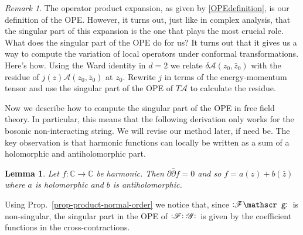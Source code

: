 \documentclass{report}
\theoremstyle{plain}
\newtheorem{lemma}[theorem]{Lemma}
\theoremstyle{definition}
\theoremstyle{remark}
\newtheorem*{remark}{Remark}
\newcommand{\FR}[2]{\frac{#1}{#2}}
\newcommand{\ms}{\mathscr}
\newcommand{\sg}{\sigma}
\newcommand{\di}{\partial}
\newcommand{\NO}[1]{\vcentcolon\mathrel{#1}\vcentcolon\,}
\newcommand{\bC}{\mathbb{C}}
\begin{document}
\begin{remark} The operator product expansion, as given by
\eqref{OPEdefinition}, is our definition of the OPE. However, it turns out,
just like in complex analysis, that the singular part of this expansion is
the one that plays the most crucial role. What does the singular part of
the OPE do for us? It turns out that it gives us a way to compute the
variation of local operators under conformal transformations. Here's how.
Using the Ward identity in $d=2$ we relate $\delta\ms A(z_0,\bar z_0)$ with
the residue of $j(z)\ms A(z_0,\bar z_0)$ at $z_0$. Rewrite $j$ in terms of
the energy-momentum tensor and use the singular part of the OPE of $T\ms A$
to calculate the residue.

Now we describe how to compute the singular part of the OPE in free field
theory. In particular, this means that the following derivation only works
for the bosonic non-interacting string. We will revise our method
later, if need be. The key observation is that harmonic functions can
locally be written as a sum of a holomorphic and antiholomorphic part.
\end{remark}
\begin{lemma} Let $f : \bC \to \bC$ be harmonic. Then $\di\bar\di f = 0$
and so $f = a(z) + b(\bar z)$ where $a$ is holomorphic and $b$ is
antiholomorphic.
\end{lemma}

Using Prop.~\ref{prop-product-normal-order} we notice that, since
$\NO{\ms F\ms g}$ is non-singular, the singular
part in the OPE of $\NO{\ms F}\NO{\ms G}$ is given by the coefficient
functions in the cross-contractions.

\end{document}
